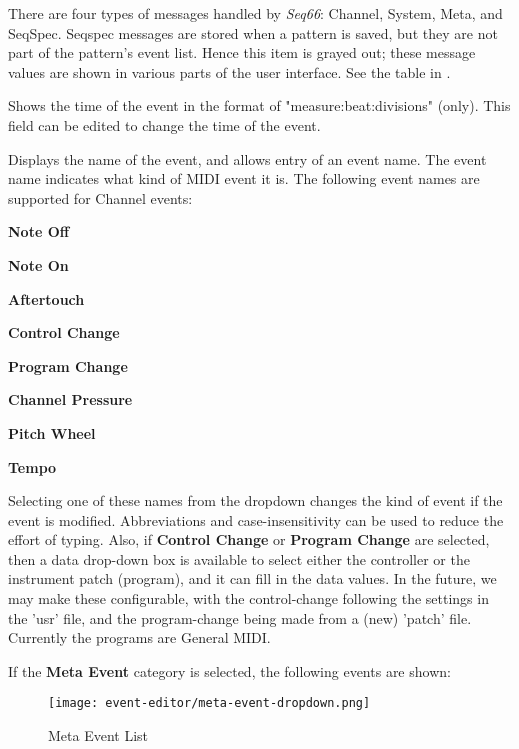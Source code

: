    There are four types of messages handled by \textsl{Seq66}:
   Channel, System, Meta, and SeqSpec. 
   Seqspec messages are stored when a pattern is saved, but they are
   not part of the pattern's event list.
   Hence this item is grayed out; these message values are shown in various
   parts of the user interface.
   See the table in .

   Shows the time of the event in the format of "measure:beat:divisions" (only).
   This field can be edited to change the time of the event.

   Displays the name of the event, and allows entry of an event name.
   The event name indicates what kind of MIDI event it is. 
   The following event names are supported for Channel events:

   \begin{enumber}
      \item \textbf{Note Off}
      \item \textbf{Note On}
      \item \textbf{Aftertouch}
      \item \textbf{Control Change}
      \item \textbf{Program Change}
      \item \textbf{Channel Pressure}
      \item \textbf{Pitch Wheel}
      \item \textbf{Tempo}
   \end{enumber}

   Selecting one of these names from the dropdown changes the kind of event if
   the event is modified.  Abbreviations and case-insensitivity can be used to
   reduce the effort of typing.
   Also, if \textbf{Control Change} or
   \textbf{Program Change} are selected, then a data drop-down box is available
   to select either the controller or
   the instrument patch (program), and it can fill in the data values.
   In the future, we may make these configurable, with the control-change
   following the settings in the 'usr' file, and the program-change being made
   from a (new) 'patch' file. Currently the programs are General MIDI.

   If the \textbf{Meta Event} category is selected, the following events are
   shown:

\begin{figure}[H]
   \centering
   \texttt{[image: event-editor/meta-event-dropdown.png]}
   \caption{Meta Event List}
   \label{fig:event_editor_meta_dropdown}
\end{figure}

